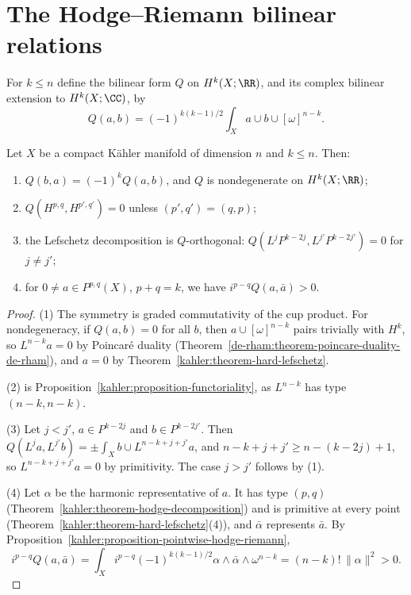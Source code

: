 \section{The Hodge--Riemann bilinear relations}\label{kahler:section-hodge-riemann}

\begin{definition}\label{kahler:definition-q}
For $k \leq n$ define the bilinear form $Q$ on $H^k(X; \RR)$, and its complex bilinear extension to $H^k(X; \CC)$, by
\[
Q(a, b) = (-1)^{k(k-1)/2}\int_Xa \cup b \cup [\omega]^{n-k} .
\]
\end{definition}

\begin{theorem}\label{kahler:theorem-hodge-riemann}
Let $X$ be a compact K\"ahler manifold of dimension $n$ and $k \leq n$. Then:
\begin{enumerate}
\item $Q(b, a) = (-1)^kQ(a, b)$, and $Q$ is nondegenerate on $H^k(X; \RR)$;
\item $Q(H^{p,q}, H^{p',q'}) = 0$ unless $(p', q') = (q, p)$;
\item the Lefschetz decomposition is $Q$-orthogonal: $Q(L^jP^{k-2j}, L^{j'}P^{k-2j'}) = 0$ for $j \neq j'$;
\item for $0 \neq a \in P^{p,q}(X)$, $p + q = k$, we have $i^{p-q}Q(a, \bar a) > 0$.
\end{enumerate}
\end{theorem}

\begin{proof}
(1) The symmetry is graded commutativity of the cup product. For nondegeneracy, if $Q(a, b) = 0$ for all $b$, then $a \cup [\omega]^{n-k}$
pairs trivially with $H^k$, so $L^{n-k}a = 0$ by Poincar\'e duality (Theorem~\ref{de-rham:theorem-poincare-duality-de-rham}), and $a = 0$ by
Theorem~\ref{kahler:theorem-hard-lefschetz}.

(2) is Proposition~\ref{kahler:proposition-functoriality}, as $L^{n-k}$ has type $(n-k, n-k)$.

(3) Let $j < j'$, $a \in P^{k-2j}$ and $b \in P^{k-2j'}$. Then $Q(L^ja, L^{j'}b) = \pm\int_Xb \cup L^{n-k+j+j'}a$, and
$n - k + j + j' \geq n - (k - 2j) + 1$, so $L^{n-k+j+j'}a = 0$ by primitivity. The case $j > j'$ follows by (1).

(4) Let $\alpha$ be the harmonic representative of $a$. It has type $(p,q)$ (Theorem~\ref{kahler:theorem-hodge-decomposition})
and is primitive at every point (Theorem~\ref{kahler:theorem-hard-lefschetz}(4)), and $\bar\alpha$ represents $\bar a$. By
Proposition~\ref{kahler:proposition-pointwise-hodge-riemann},
\[
i^{p-q}Q(a, \bar a) = \int_Xi^{p-q}(-1)^{k(k-1)/2}\alpha \wedge \bar\alpha \wedge \omega^{n-k} = (n-k)!\,\|\alpha\|^2 > 0 .
\]
\end{proof}


